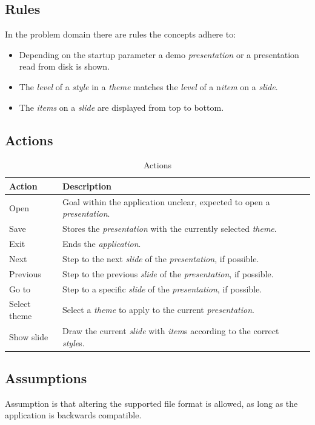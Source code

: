 \documentclass[a4paper]{article}
\begin{document}
\subsection{Rules}
In the problem domain there are rules the concepts adhere to:
\begin{itemize}
\item{Depending on the startup parameter a demo \textit{presentation} or a presentation read from disk is shown.}
\item{The \textit{level} of a \textit{style} in a \textit{theme} matches the \textit{level} of a n\textit{item} on a \textit{slide}.}
\item{The \textit{items} on a \textit{slide} are displayed from top to bottom.}
\end{itemize}

\subsection{Actions}

\begin{table}[!htpb]
\centering
\begin{tabular}{|l|l|l|l|}
\hline
\textbf{Action} & \textbf{Description}\\
\hline
\hline
Open & Goal within the application unclear, expected to open a \textit{presentation}.\\
\hline
Save & Stores the \textit{presentation} with the currently selected \textit{theme}.\\ 
\hline
Exit & Ends the \textit{application}.\\
\hline
Next & Step to the next \textit{slide} of the \textit{presentation}, if possible.\\
\hline
Previous & Step to the previous \textit{slide} of the \textit{presentation}, if possible.\\
\hline
Go to & Step to a specific \textit{slide} of the \textit{presentation}, if possible.\\
\hline
Select theme & Select a \textit{theme} to apply to the current \textit{presentation}.\\
\hline
Show slide & Draw the current \textit{slide} with \textit{item}s according to the correct \textit{style}s.\\
\hline
\end{tabular}
\caption{Actions}
\label{tab:template}
\end{table}

\subsection{Assumptions}
Assumption is that altering the supported file format is allowed, as long as the application is backwards compatible.
\end{document}
